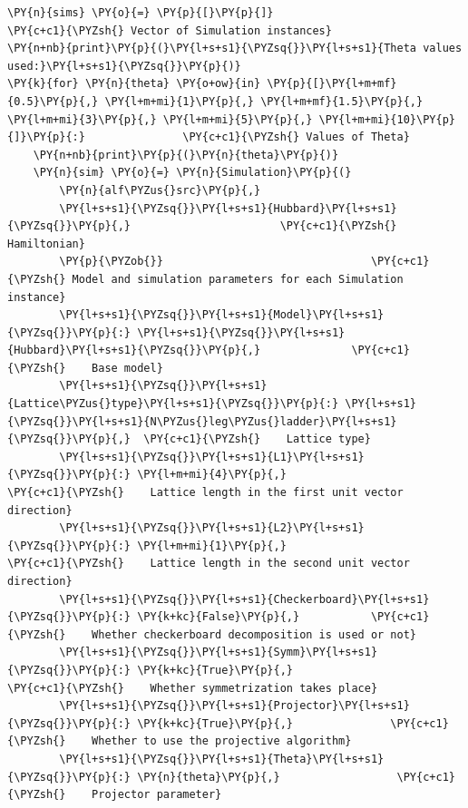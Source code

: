     \begin{tcolorbox}[breakable, size=fbox, boxrule=1pt, pad at break*=1mm,colback=cellbackground, colframe=cellborder]
\begin{Verbatim}[commandchars=\\\{\}]
\PY{n}{sims} \PY{o}{=} \PY{p}{[}\PY{p}{]}                                \PY{c+c1}{\PYZsh{} Vector of Simulation instances}
\PY{n+nb}{print}\PY{p}{(}\PY{l+s+s1}{\PYZsq{}}\PY{l+s+s1}{Theta values used:}\PY{l+s+s1}{\PYZsq{}}\PY{p}{)}
\PY{k}{for} \PY{n}{theta} \PY{o+ow}{in} \PY{p}{[}\PY{l+m+mf}{0.5}\PY{p}{,} \PY{l+m+mi}{1}\PY{p}{,} \PY{l+m+mf}{1.5}\PY{p}{,} \PY{l+m+mi}{3}\PY{p}{,} \PY{l+m+mi}{5}\PY{p}{,} \PY{l+m+mi}{10}\PY{p}{]}\PY{p}{:}               \PY{c+c1}{\PYZsh{} Values of Theta}
    \PY{n+nb}{print}\PY{p}{(}\PY{n}{theta}\PY{p}{)}
    \PY{n}{sim} \PY{o}{=} \PY{n}{Simulation}\PY{p}{(}
        \PY{n}{alf\PYZus{}src}\PY{p}{,}
        \PY{l+s+s1}{\PYZsq{}}\PY{l+s+s1}{Hubbard}\PY{l+s+s1}{\PYZsq{}}\PY{p}{,}                       \PY{c+c1}{\PYZsh{} Hamiltonian}
        \PY{p}{\PYZob{}}                                \PY{c+c1}{\PYZsh{} Model and simulation parameters for each Simulation instance}
        \PY{l+s+s1}{\PYZsq{}}\PY{l+s+s1}{Model}\PY{l+s+s1}{\PYZsq{}}\PY{p}{:} \PY{l+s+s1}{\PYZsq{}}\PY{l+s+s1}{Hubbard}\PY{l+s+s1}{\PYZsq{}}\PY{p}{,}              \PY{c+c1}{\PYZsh{}    Base model}
        \PY{l+s+s1}{\PYZsq{}}\PY{l+s+s1}{Lattice\PYZus{}type}\PY{l+s+s1}{\PYZsq{}}\PY{p}{:} \PY{l+s+s1}{\PYZsq{}}\PY{l+s+s1}{N\PYZus{}leg\PYZus{}ladder}\PY{l+s+s1}{\PYZsq{}}\PY{p}{,}  \PY{c+c1}{\PYZsh{}    Lattice type}
        \PY{l+s+s1}{\PYZsq{}}\PY{l+s+s1}{L1}\PY{l+s+s1}{\PYZsq{}}\PY{p}{:} \PY{l+m+mi}{4}\PY{p}{,}                         \PY{c+c1}{\PYZsh{}    Lattice length in the first unit vector direction}
        \PY{l+s+s1}{\PYZsq{}}\PY{l+s+s1}{L2}\PY{l+s+s1}{\PYZsq{}}\PY{p}{:} \PY{l+m+mi}{1}\PY{p}{,}                         \PY{c+c1}{\PYZsh{}    Lattice length in the second unit vector direction}
        \PY{l+s+s1}{\PYZsq{}}\PY{l+s+s1}{Checkerboard}\PY{l+s+s1}{\PYZsq{}}\PY{p}{:} \PY{k+kc}{False}\PY{p}{,}           \PY{c+c1}{\PYZsh{}    Whether checkerboard decomposition is used or not}
        \PY{l+s+s1}{\PYZsq{}}\PY{l+s+s1}{Symm}\PY{l+s+s1}{\PYZsq{}}\PY{p}{:} \PY{k+kc}{True}\PY{p}{,}                    \PY{c+c1}{\PYZsh{}    Whether symmetrization takes place}
        \PY{l+s+s1}{\PYZsq{}}\PY{l+s+s1}{Projector}\PY{l+s+s1}{\PYZsq{}}\PY{p}{:} \PY{k+kc}{True}\PY{p}{,}               \PY{c+c1}{\PYZsh{}    Whether to use the projective algorithm}
        \PY{l+s+s1}{\PYZsq{}}\PY{l+s+s1}{Theta}\PY{l+s+s1}{\PYZsq{}}\PY{p}{:} \PY{n}{theta}\PY{p}{,}                  \PY{c+c1}{\PYZsh{}    Projector parameter}

\end{Verbatim}
\end{tcolorbox}
